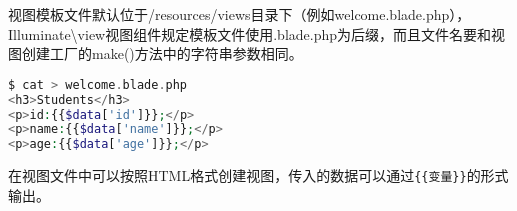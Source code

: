 视图模板文件默认位于/resources/views目录下（例如welcome.blade.php），Illuminate\textbackslash view视图组件规定模板文件使用.blade.php为后缀，而且文件名要和视图创建工厂的make()方法中的字符串参数相同。

\begin{lstlisting}[language=PHP]
$ cat > welcome.blade.php
<h3>Students</h3>
<p>id:{{$data['id']}};</p>
<p>name:{{$data['name']}};</p>
<p>age:{{$data['age']}};</p>
\end{lstlisting}

在视图文件中可以按照HTML格式创建视图，传入的数据可以通过\texttt{\{\{变量\}\}}的形式输出。































